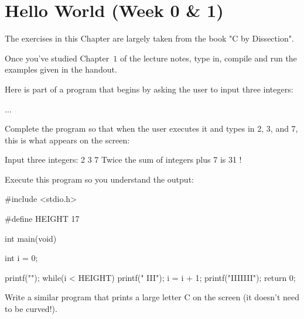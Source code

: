 \pagestyle{fancy} %




\chapter{Hello World (Week 0 \& 1)}

The exercises in this Chapter are largely taken from the book "C by Dissection".

\begin{exercise}
Once you've studied Chapter~$1$ of the lecture notes, type in, compile and run the examples given in the handout.
\end{exercise}

Here is part of a program that begins by asking the user to input three
integers:
\begin{codesnippet}
#include <stdio.h>

int main(void)
{
   int a, b, c;

   printf("Input three integers: ");
\end{codesnippet}
$\ldots$\\

\begin{exercise}
Complete the program so that when the user executes it and types in 2, 3,
and 7, this is what appears on the screen:
\begin{terminaloutput}
Input three integers: 2 3 7
Twice the sum of integers plus 7 is 31 !
\end{terminaloutput}
\end{exercise}


Execute this program so you understand the output:

\begin{codesnippet}
#include <stdio.h>

#define HEIGHT 17

int main(void)
{

   int i = 0;

   printf("\n\nIIIIIII\n");
   while(i < HEIGHT){
      printf("  III\n");
      i = i + 1;
   }
   printf("IIIIIII\n\n\n");
   return 0;

}
\end{codesnippet}

\begin{exercise}
Write a similar program
that prints a large letter C on the screen (it doesn't need to be curved!).
\end{exercise}

